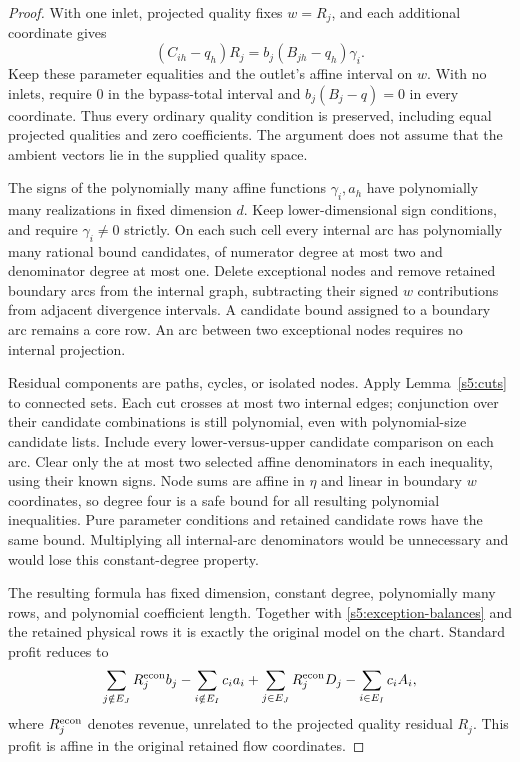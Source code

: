 \begin{proof}
With one inlet, projected quality fixes $w=R_j$, and each additional
coordinate gives
\[
 (C_{ih}-q_h)R_j=b_j(B_{jh}-q_h)\gamma_i.
\]
Keep these parameter equalities and the outlet's affine interval on
$w$. With no inlets, require $0$ in the bypass-total interval and
$b_j(B_j-q)=0$ in every coordinate. Thus every ordinary quality
condition is preserved, including equal projected qualities and zero
coefficients. The argument does not assume that the ambient vectors lie
in the supplied quality space.

The signs of the polynomially many affine functions $\gamma_i,a_h$
have polynomially many realizations in fixed dimension $d$. Keep
lower-dimensional sign conditions, and require $\gamma_i\ne0$ strictly.
On each such cell every internal arc has polynomially many rational
bound candidates, of numerator degree at most two and denominator
degree at most one. Delete exceptional nodes and remove retained
boundary arcs from the internal graph, subtracting their signed $w$
contributions from adjacent divergence intervals. A candidate bound
assigned to a boundary arc remains a core row. An arc between two
exceptional nodes requires no internal projection.

Residual components are paths, cycles, or isolated nodes. Apply
Lemma~\ref{s5:cuts} to connected sets. Each cut crosses at most two
internal edges; conjunction over their candidate combinations is still
polynomial, even with polynomial-size candidate lists. Include every
lower-versus-upper candidate comparison on each arc. Clear only the
at most two selected affine denominators in each inequality, using their
known signs. Node sums are affine in $\eta$ and linear in boundary
$w$ coordinates, so degree four is a safe bound for all resulting
polynomial inequalities. Pure parameter conditions and retained
candidate rows have the same bound. Multiplying all internal-arc
denominators would be unnecessary and would lose this constant-degree
property.

The resulting formula has fixed dimension, constant degree,
polynomially many rows, and polynomial coefficient length. Together
with \eqref{s5:exception-balances} and the retained physical rows it is
exactly the original model on the chart. Standard profit reduces to
\begin{equation}
 \sum_{j\notin E_J}R_j^{\rm econ}b_j-
 \sum_{i\notin E_I}c_i a_i+
 \sum_{j\in E_J}R_j^{\rm econ}D_j-
 \sum_{i\in E_I}c_i A_i,
 \label{s5:exception-profit}
\end{equation}
where $R_j^{\rm econ}$ denotes revenue, unrelated to the
projected quality residual $R_j$. This profit is affine in the original retained
flow coordinates.


\end{proof}
